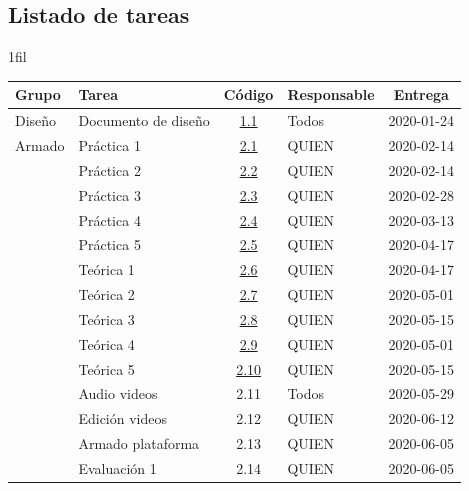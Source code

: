 \documentclass[12pt]{report}
\makeatletter
\newcommand*{\centerfloat}{%
  \parindent \z@
  \leftskip \z@ \@plus 1fil \@minus \textwidth
  \rightskip\leftskip
  \parfillskip \z@skip}
\makeatother
\begin{document}
\subsection{Listado de tareas}

\begin{table}[h!]
\centerfloat
\small
\begin{tabular}{@{}llclc@{}}
\toprule
Grupo   & Tarea                & Código & Responsable             & Entrega      \\ \midrule
Diseño  & Documento de diseño  & \href{https://www.overleaf.com/}{1.1}    & Todos                   & 2020-01-24 \\ \midrule
Armado  & Práctica 1           & \href{https://www.overleaf.com/}{2.1}    & QUIEN      & 2020-02-14 \\
        & Práctica 2           & \href{https://www.overleaf.com/}{2.2}    & QUIEN        & 2020-02-14 \\
        & Práctica 3           & \href{https://www.overleaf.com/}{2.3}    & QUIEN        & 2020-02-28 \\
        & Práctica 4           & \href{https://www.overleaf.com/}{2.4}    & QUIEN      & 2020-03-13 \\
        & Práctica 5           & \href{https://www.overleaf.com/}{2.5}    & QUIEN      & 2020-04-17 \\
        & Teórica 1            & \href{https://www.overleaf.com/}{2.6}    & QUIEN        & 2020-04-17 \\
        & Teórica 2            & \href{https://www.overleaf.com/}{2.7}    & QUIEN        & 2020-05-01 \\
        & Teórica 3            & \href{https://www.overleaf.com/}{2.8}    & QUIEN        & 2020-05-15 \\
        & Teórica 4            & \href{https://www.overleaf.com/}{2.9}    & QUIEN      & 2020-05-01 \\
        & Teórica 5            & \href{https://www.overleaf.com/}{2.10}   & QUIEN      & 2020-05-15 \\
        & Audio videos         & 2.11   & Todos                   & 2020-05-29 \\
        & Edición videos       & 2.12   & QUIEN       & 2020-06-12 \\
        & Armado plataforma    & 2.13   & QUIEN        & 2020-06-05 \\
        & Evaluación 1         & 2.14   & QUIEN      & 2020-06-05 \\

\end{tabular}
\end{table}
\end{document}
